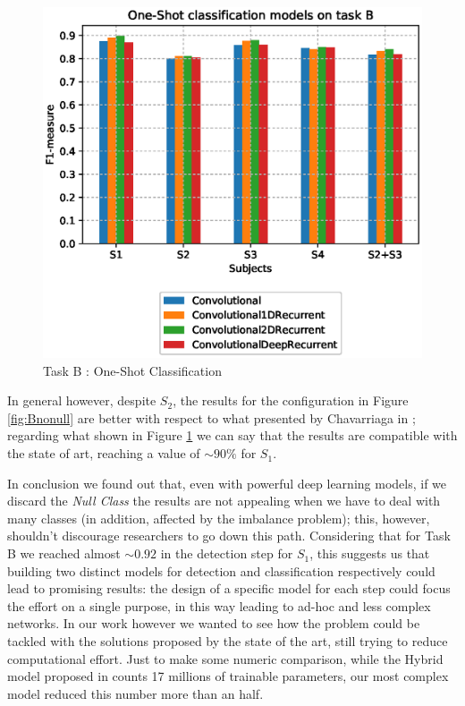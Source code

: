 \begin{figure}[ht]
	\centering
	\includegraphics[scale=.4]{figure/B_models_nullclass}
	\caption{Task B : One-Shot Classification}
	\label{fig:Bnull}
\end{figure}

In general however, despite $S_2$, the results for the configuration in Figure \ref{fig:Bnonull} are better with respect to what presented by Chavarriaga in \cite{Chavarriaga2013}; regarding what shown in Figure \ref{fig:Bnull} we can say that the results are compatible with the state of art, reaching a value of $\sim 90\%$ for $S_1$. 

In conclusion we found out that, even with powerful deep learning models, if we discard the \textit{Null Class} the results are not appealing when we have to deal with many classes (in addition, affected by the imbalance problem); this, however, shouldn't discourage researchers to go down this path. Considering that for Task B we reached almost $\sim 0.92$ in the detection step for $S_1$, this suggests us that building two distinct models for detection and classification respectively could lead to promising results: the design of a specific model for each step could focus the effort on a single purpose, in this way leading to ad-hoc and less complex networks. In our work however we wanted to see how the problem could be tackled with the solutions proposed by the state of the art, still trying to reduce computational effort. Just to make some numeric comparison, while the Hybrid model proposed in \cite{HAR-COMP2018} counts 17 millions of trainable parameters, our most complex model reduced this number more than an half. 

